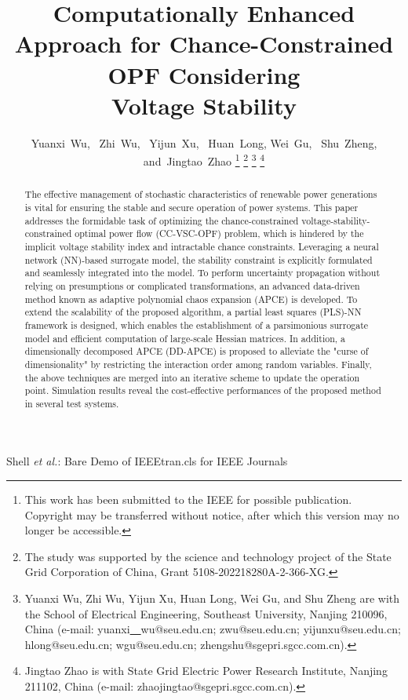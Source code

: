 \documentclass[journal]{IEEEtran}
\theoremstyle{definition}
\theoremstyle{remark}
\begin{document}
\title{Computationally Enhanced Approach for Chance-Constrained OPF Considering \\Voltage Stability}


\author{Yuanxi~Wu,~
        Zhi~Wu,~
        Yijun~Xu,~
        Huan~Long,
        Wei~Gu,~
        Shu~Zheng,
        and~Jingtao~Zhao%
        \thanks{This work has been submitted to the IEEE for possible publication. Copyright may be transferred without notice, after which this version may no longer be accessible.}
        \thanks{The study was supported by the science and technology project of the State Grid Corporation of China, Grant 5108-202218280A-2-366-XG.}
\thanks{Yuanxi Wu, Zhi Wu, Yijun Xu, Huan Long, Wei Gu, and Shu Zheng are with the School
of Electrical Engineering, Southeast University, Nanjing 210096, China (e-mail: yuanxi\underline{~~}wu@seu.edu.cn; zwu@seu.edu.cn; yijunxu@seu.edu.cn; hlong@seu.edu.cn; wgu@seu.edu.cn; zhengshu@sgepri.sgcc.com.cn).}%
\thanks{Jingtao Zhao is with State Grid Electric Power Research Institute, Nanjing 211102, China (e-mail: zhaojingtao@sgepri.sgcc.com.cn).}%
}

 {Shell \MakeLowercase{\textit{et al.}}: Bare Demo of IEEEtran.cls for IEEE Journals}

\maketitle

\begin{abstract}
The effective management of stochastic characteristics of renewable power generations is vital for ensuring the stable and secure operation of power systems. This paper addresses the formidable task of optimizing the chance-constrained voltage-stability-constrained optimal power flow (CC-VSC-OPF) problem, which is hindered by the implicit voltage stability index and intractable chance constraints.
Leveraging a neural network (NN)-based surrogate model, the stability constraint is explicitly formulated and seamlessly integrated into the model. To perform uncertainty propagation without relying on presumptions or complicated transformations, an advanced data-driven method known as adaptive polynomial chaos expansion (APCE) is developed. To extend the scalability of the proposed algorithm, a partial least squares (PLS)-NN framework is designed, which enables the establishment of a parsimonious surrogate model and efficient computation of large-scale Hessian matrices. In addition, a dimensionally decomposed APCE (DD-APCE) is proposed to alleviate the "curse of dimensionality" by restricting the interaction order among random variables. Finally, the above techniques are merged into an iterative scheme to update the operation point.
Simulation results reveal the cost-effective performances of the proposed method in several test systems. 
\end{abstract}
\end{document}
